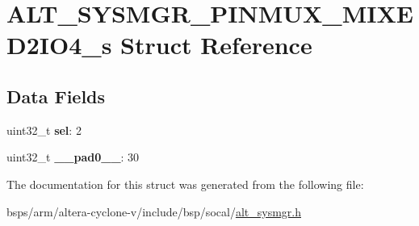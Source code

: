 \hypertarget{structALT__SYSMGR__PINMUX__MIXED2IO4__s}{}\section{A\+L\+T\+\_\+\+S\+Y\+S\+M\+G\+R\+\_\+\+P\+I\+N\+M\+U\+X\+\_\+\+M\+I\+X\+E\+D2\+I\+O4\+\_\+s Struct Reference}
\label{structALT__SYSMGR__PINMUX__MIXED2IO4__s}
\subsection*{Data Fields}
\begin{DoxyCompactItemize}
\item 
\mbox{\label{structALT__SYSMGR__PINMUX__MIXED2IO4__s_a1800d134106754eca1df7049d1610314}} 
uint32\+\_\+t {\bfseries sel}\+: 2
\item 
\mbox{\label{structALT__SYSMGR__PINMUX__MIXED2IO4__s_aabf6b3dcf449845fa8066b40460ff478}} 
uint32\+\_\+t {\bfseries \+\_\+\+\_\+pad0\+\_\+\+\_\+}\+: 30
\end{DoxyCompactItemize}


The documentation for this struct was generated from the following file\+:\begin{DoxyCompactItemize}
\item 
bsps/arm/altera-\/cyclone-\/v/include/bsp/socal/\mbox{\hyperlink{alt__sysmgr_8h}{alt\+\_\+sysmgr.\+h}}\end{DoxyCompactItemize}
